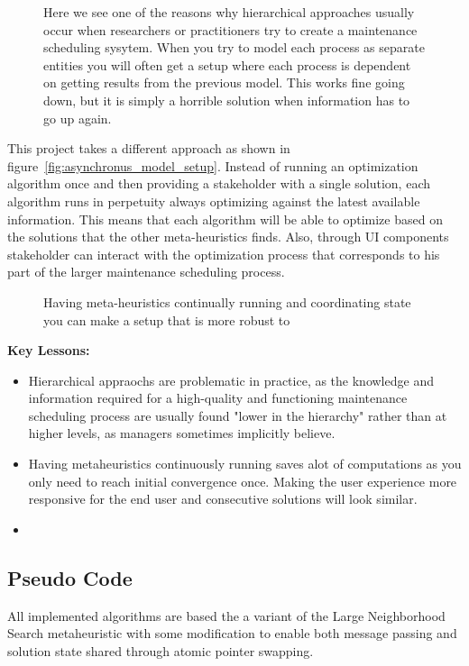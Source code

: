 \begin{figure}[H]
	\centering
	
	\caption{
		Here we see one of the reasons why hierarchical approaches usually occur when researchers or practitioners try to create a 
		maintenance scheduling sysytem. When you try to model each process as separate entities you will often get a setup where each
		process is dependent on getting results from the previous model. This works fine going down, but it is simply a horrible solution
		when information has to go up again.  
	}
\end{figure}

This project takes a different approach as shown in figure~\ref{fig:asynchronus_model_setup}. Instead of running an optimization algorithm once and then providing a stakeholder with a single 
solution, each algorithm runs in perpetuity always optimizing against the latest available information. This means that each algorithm will
be able to optimize based on the solutions that the other meta-heuristics finds. Also, through UI components stakeholder can interact with the
optimization process that corresponds to his part of the larger maintenance scheduling process. 

\begin{figure}[H]
	\centering
	
	\caption{
		Having meta-heuristics continually running and coordinating state you can make a setup that is more robust to 
	}
	\label{
		fig:asynchronus_model_setup
	}
\end{figure}

\textbf{Key Lessons:}
\begin{itemize}
	\item Hierarchical appraochs are problematic in practice, as the knowledge and information required for a high-quality and functioning maintenance 
		  scheduling process are usually found "lower in the hierarchy" rather than at higher levels, as managers sometimes implicitly believe.
	\item Having metaheuristics continuously running saves alot of computations as you only need to reach initial convergence once. Making the 
	      user experience more responsive for the end user and consecutive solutions will look similar.
	\item  
\end{itemize}

\subsection*{Pseudo Code}

All implemented algorithms are based the a variant of the Large Neighborhood Search metaheuristic with some modification to enable both message
passing and solution state shared through atomic pointer swapping. 

\begin{figure}[H]
	
\end{figure}



